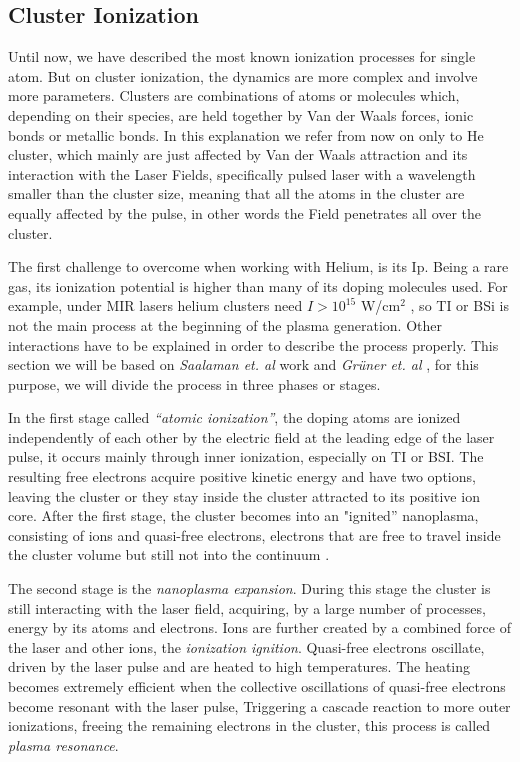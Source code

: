 \subsection{Cluster Ionization}

Until now, we have described the most known ionization processes for single atom. But on cluster ionization, the dynamics are more complex and involve more parameters. Clusters are combinations of atoms or molecules which, depending on their species, are held together by Van der Waals forces, ionic bonds or metallic bonds. In this explanation we refer from now on only to He cluster, which mainly are just affected by Van der Waals attraction\cite{stienkemeier_spectroscopy_2006} and its interaction with the Laser Fields, specifically pulsed laser with  a wavelength smaller than the cluster size, meaning that all the atoms in the cluster are equally affected by the pulse, in other words the Field penetrates all over the cluster.

The first challenge to overcome when working with Helium, is its Ip. Being a rare gas, its ionization potential is higher than many of its doping molecules used. For example, under MIR lasers helium clusters need $I > 10^{15}$ W/cm$^{2}$ , so TI or BSi is not the main process at the beginning of the plasma generation. Other interactions have to be explained in order to describe the process properly. This section we will be based on \textit{Saalaman et. al} work \cite{saalmann_mechanisms_2006} and \textit{Grüner et. al} \cite{gruner_femtosekundenspektroskopie_2013}, for this purpose, we will divide the process in three phases or stages.


In the first stage called \textit{“atomic ionization”}, the doping atoms are ionized independently of each other by the electric field at the leading edge of the laser pulse, it occurs mainly through inner ionization, especially on TI or BSI. The resulting free electrons acquire positive kinetic energy and have two options, leaving the cluster or they stay inside the cluster attracted to its positive ion core. After the first stage, the cluster becomes into an "ignited” nanoplasma, consisting of ions and quasi-free electrons, electrons that are free to travel inside the cluster volume but still not into the continuum \cite{last_quasiresonance_1999}. 


The second stage is the  \textit{nanoplasma expansion}. During this stage the cluster is still interacting with the laser field, acquiring, by a large number of processes, energy by its atoms and electrons. Ions are further created by a combined force of the laser and other ions, the \textit{ionization ignition}\cite{gruner_femtosekundenspektroskopie_2013}. Quasi-free electrons oscillate, driven by the laser pulse and are heated to high temperatures. The heating becomes extremely efficient when the collective oscillations of quasi-free electrons become resonant with the laser pulse, Triggering a cascade reaction to more outer ionizations,  freeing the remaining electrons in the cluster, this process is called \textit{plasma resonance}\cite{saalmann_mechanisms_2006}.


